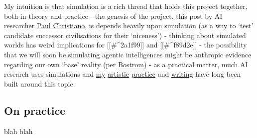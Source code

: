 \documentclass[
]{article}
\begin{document}
My intuition is that simulation is a rich thread that holds this project
together, both in theory and practice - the genesis of the project, this
post by AI researcher
\href{https://ai-alignment.com/sympathizing-with-ai-e11a4bf5ef6e}{Paul
Christiano}, is depends heavily upon simulation (as a way to `test'
candidate successor civilisations for their `niceness') - thinking about
simulated worlds has weird implications for {[}{[}\#\^{}2a1f99{]}{]} and
{[}{[}\#\^{}f89d2e{]}{]} - the possibility that we will soon be
simulating agentic intelligences might be anthropic evidence regarding
our own `base' reality (per
\href{https://simulation-argument.com/}{Bostrom}) - as a practical
matter, much AI research uses simulations and
\href{http://ukc10014.org/exorbp.html}{my}
\href{http://ukc10014.org/sicul.html}{artistic}
\href{http://ukc10014.org/islands2.html}{practice} and
\href{http://ukc10014.org/writing.html}{writing} have long been built
around this topic

\subsection{On practice}\label{on-practice}

blah blah
\end{document}
